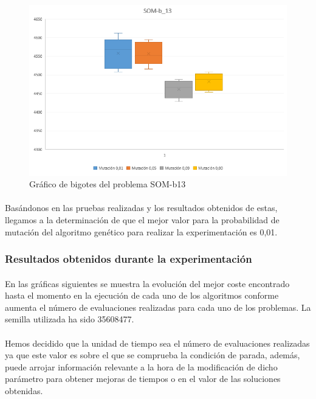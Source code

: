 	\begin{figure}[H]
		
		\centering
		\includegraphics[scale=0.65]{img/BigotesMutacion0SOM_3}
		\caption{Gráfico de bigotes del problema SOM-b13}
		
	\end{figure}

	\paragraph{}Basándonos en las pruebas realizadas y los resultados obtenidos de estas, llegamos a la determinación de que el mejor valor para la probabilidad de mutación del algoritmo genético para realizar la experimentación es 0,01.

	\subsubsection{Resultados obtenidos durante la experimentación}

	\paragraph{} En las gráficas siguientes se muestra la evolución del mejor coste encontrado hasta el momento en la ejecución de cada uno de los algoritmos conforme aumenta el número de evaluaciones realizadas para cada uno de los problemas. La semilla utilizada ha sido 35608477.
	
	\paragraph{}Hemos decidido que la unidad de tiempo sea el número de evaluaciones realizadas ya que este valor es sobre el que se comprueba la condición de parada, además, puede arrojar información relevante a la hora de la modificación de dicho parámetro para obtener mejoras de tiempos o en el valor de las soluciones obtenidas.

